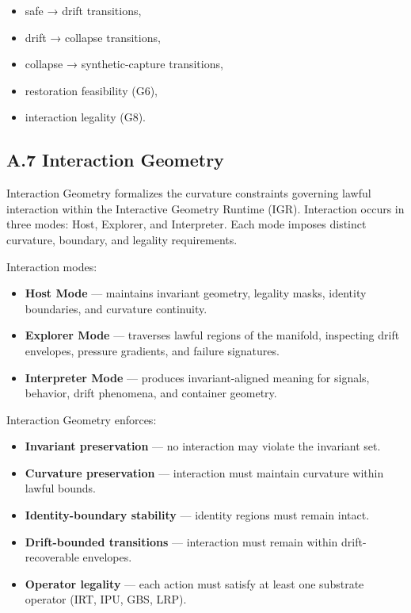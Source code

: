 \begin{itemize}
    \item safe → drift transitions,
    \item drift → collapse transitions,
    \item collapse → synthetic-capture transitions,
    \item restoration feasibility (G6),
    \item interaction legality (G8).
\end{itemize}

\subsection*{A.7 Interaction Geometry}

\noindent Interaction Geometry formalizes the curvature constraints governing
lawful interaction within the Interactive Geometry Runtime (IGR). Interaction
occurs in three modes: Host, Explorer, and Interpreter. Each mode imposes
distinct curvature, boundary, and legality requirements.

\medskip

\noindent Interaction modes:

\begin{itemize}
    \item \textbf{Host Mode} — maintains invariant geometry, legality masks,
    identity boundaries, and curvature continuity.
    \item \textbf{Explorer Mode} — traverses lawful regions of the manifold,
    inspecting drift envelopes, pressure gradients, and failure signatures.
    \item \textbf{Interpreter Mode} — produces invariant-aligned meaning for
    signals, behavior, drift phenomena, and container geometry.
\end{itemize}

\medskip

\noindent Interaction Geometry enforces:

\begin{itemize}
    \item \textbf{Invariant preservation} — no interaction may violate the
    invariant set.
    \item \textbf{Curvature preservation} — interaction must maintain curvature
    within lawful bounds.
    \item \textbf{Identity-boundary stability} — identity regions must remain
    intact.
    \item \textbf{Drift-bounded transitions} — interaction must remain within
    drift-recoverable envelopes.
    \item \textbf{Operator legality} — each action must satisfy at least one
    substrate operator (IRT, IPU, GBS, LRP).
\end{itemize}

